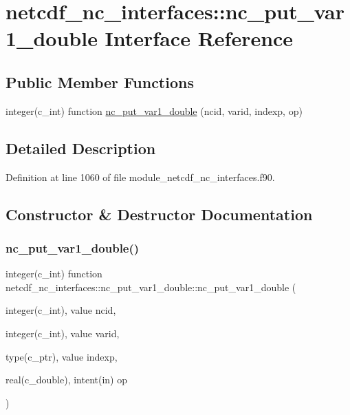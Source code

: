\hypertarget{interfacenetcdf__nc__interfaces_1_1nc__put__var1__double}{}\section{netcdf\+\_\+nc\+\_\+interfaces\+:\+:nc\+\_\+put\+\_\+var1\+\_\+double Interface Reference}
\label{interfacenetcdf__nc__interfaces_1_1nc__put__var1__double}
\subsection*{Public Member Functions}
\begin{DoxyCompactItemize}
\item 
integer(c\+\_\+int) function \hyperlink{interfacenetcdf__nc__interfaces_1_1nc__put__var1__double_a03ddd4aafe4d0dea59be778155e96b10}{nc\+\_\+put\+\_\+var1\+\_\+double} (ncid, varid, indexp, op)
\end{DoxyCompactItemize}


\subsection{Detailed Description}


Definition at line 1060 of file module\+\_\+netcdf\+\_\+nc\+\_\+interfaces.\+f90.



\subsection{Constructor \& Destructor Documentation}
\mbox{\label{interfacenetcdf__nc__interfaces_1_1nc__put__var1__double_a03ddd4aafe4d0dea59be778155e96b10}} 
\subsubsection{\texorpdfstring{nc\+\_\+put\+\_\+var1\+\_\+double()}{nc\_put\_var1\_double()}}
{\footnotesize\ttfamily integer(c\+\_\+int) function netcdf\+\_\+nc\+\_\+interfaces\+::nc\+\_\+put\+\_\+var1\+\_\+double\+::nc\+\_\+put\+\_\+var1\+\_\+double (\begin{DoxyParamCaption}\item[{integer(c\+\_\+int), value}]{ncid,  }\item[{integer(c\+\_\+int), value}]{varid,  }\item[{type(c\+\_\+ptr), value}]{indexp,  }\item[{real(c\+\_\+double), intent(in)}]{op }\end{DoxyParamCaption})}



